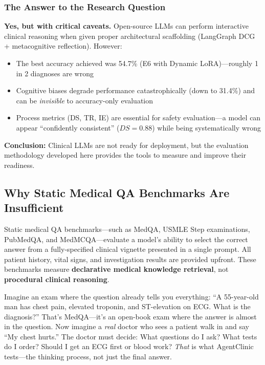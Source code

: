 \subsubsection{The Answer to the Research Question}

\begin{acadbox}[\textcolor{white}{Summary Answer}]
\textbf{Yes, but with critical caveats.} Open-source LLMs can perform interactive clinical reasoning when given proper architectural scaffolding (LangGraph DCG + metacognitive reflection). However:
\begin{itemize}
    \item The best accuracy achieved was 54.7\% (E6 with Dynamic LoRA)---roughly 1 in 2 diagnoses are wrong
    \item Cognitive biases degrade performance catastrophically (down to 31.4\%) and can be \textit{invisible} to accuracy-only evaluation
    \item Process metrics (DS, TR, IE) are essential for safety evaluation---a model can appear ``confidently consistent'' ($DS = 0.88$) while being systematically wrong
\end{itemize}
\textbf{Conclusion:} Clinical LLMs are not ready for deployment, but the evaluation methodology developed here provides the tools to measure and improve their readiness.
\end{acadbox}

\subsection{Why Static Medical QA Benchmarks Are Insufficient}

\begin{acadbox}[\textcolor{white}{Academic Definition}]
Static medical QA benchmarks---such as MedQA, USMLE Step examinations, PubMedQA, and MedMCQA---evaluate a model's ability to select the correct answer from a fully-specified clinical vignette presented in a single prompt. All patient history, vital signs, and investigation results are provided upfront. These benchmarks measure \textbf{declarative medical knowledge retrieval}, not \textbf{procedural clinical reasoning}.
\end{acadbox}

\begin{analogybox}[\textcolor{white}{Simple Analogy}]
Imagine an exam where the question already tells you everything: ``A 55-year-old man has chest pain, elevated troponin, and ST-elevation on ECG. What is the diagnosis?'' That's MedQA---it's an open-book exam where the answer is almost in the question. Now imagine a \textit{real} doctor who sees a patient walk in and say ``My chest hurts.'' The doctor must decide: What questions do I ask? What tests do I order? Should I get an ECG first or blood work? \textit{That} is what AgentClinic tests---the thinking process, not just the final answer.
\end{analogybox}

